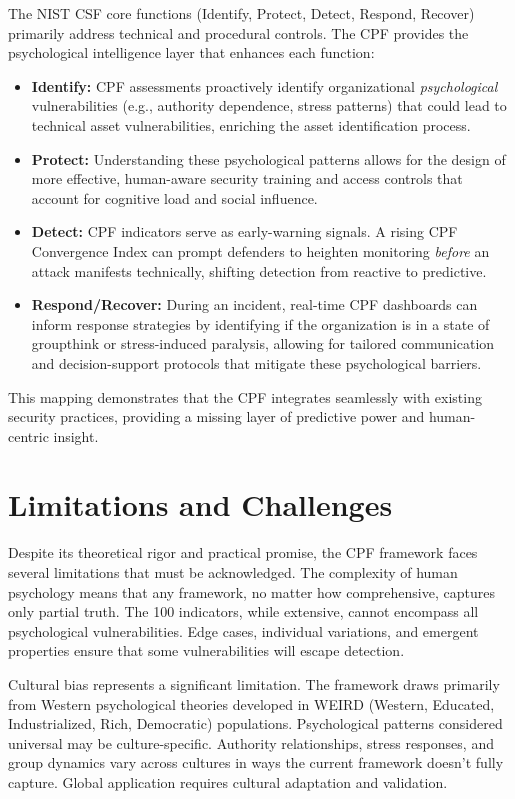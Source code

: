 \documentclass[manuscript,screen,review]{acmart}
\begin{document}
The NIST CSF core functions (Identify, Protect, Detect, Respond, Recover) primarily address technical and procedural controls. The CPF provides the psychological intelligence layer that enhances each function:
\begin{itemize}
    \item \textbf{Identify:} CPF assessments proactively identify organizational \textit{psychological} vulnerabilities (e.g., authority dependence, stress patterns) that could lead to technical asset vulnerabilities, enriching the asset identification process.
    \item \textbf{Protect:} Understanding these psychological patterns allows for the design of more effective, human-aware security training and access controls that account for cognitive load and social influence.
    \item \textbf{Detect:} CPF indicators serve as early-warning signals. A rising CPF Convergence Index can prompt defenders to heighten monitoring \textit{before} an attack manifests technically, shifting detection from reactive to predictive.
    \item \textbf{Respond/Recover:} During an incident, real-time CPF dashboards can inform response strategies by identifying if the organization is in a state of groupthink or stress-induced paralysis, allowing for tailored communication and decision-support protocols that mitigate these psychological barriers.
\end{itemize}

This mapping demonstrates that the CPF integrates seamlessly with existing security practices, providing a missing layer of predictive power and human-centric insight.

\section{Limitations and Challenges}

Despite its theoretical rigor and practical promise, the CPF framework faces several limitations that must be acknowledged. The complexity of human psychology means that any framework, no matter how comprehensive, captures only partial truth. The 100 indicators, while extensive, cannot encompass all psychological vulnerabilities. Edge cases, individual variations, and emergent properties ensure that some vulnerabilities will escape detection.

Cultural bias represents a significant limitation. The framework draws primarily from Western psychological theories developed in WEIRD (Western, Educated, Industrialized, Rich, Democratic) populations. Psychological patterns considered universal may be culture-specific. Authority relationships, stress responses, and group dynamics vary across cultures in ways the current framework doesn't fully capture. Global application requires cultural adaptation and validation.
\end{document}
